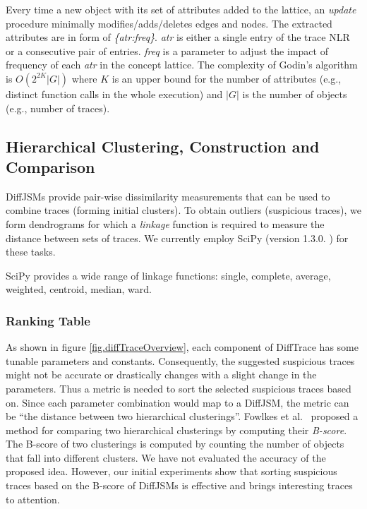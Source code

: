 Every time a new object with its set of attributes added to the lattice,
an \textit{update} procedure minimally modifies/adds/deletes edges and nodes.
%
%
The extracted attributes are in form of \textit{\{atr:freq\}}. 
%
\textit{atr} is either a single entry of the trace NLR or a consecutive pair of entries.
\textit{freq} is a parameter to adjust the impact of frequency of each \textit{atr}
in the concept lattice.
%
The complexity of Godin's algorithm is $O(2^{2K}|G|)$ where $K$ is an upper bound for the number of attributes (e.g., distinct function calls in the whole execution) and $|G|$ is the number of objects (e.g., number of traces).




\subsection{Hierarchical Clustering, Construction and Comparison}
\label{subsec:algo-bscore}

 DiffJSMs provide pair-wise dissimilarity
 measurements that can be used to combine traces (forming initial clusters).
%
To obtain outliers (suspicious traces),
we form dendrograms for which
a \textit{linkage} function is required to measure the distance between sets of traces.
% 
 We currently employ SciPy (version 1.3.0. \cite{scipy}) for these tasks.
%
%

 
%
SciPy provides a wide range of linkage functions: single, complete, average, weighted, centroid, median, ward.

\subsubsection{Ranking Table}
As shown in figure \ref{fig.diffTraceOverview}, each component of DiffTrace has some tunable parameters and constants.
%
Consequently, the suggested suspicious traces might not be accurate or drastically changes with a slight change in the parameters.
%
Thus a metric is needed to sort the selected suspicious traces based on.
%
Since each parameter combination would map to a DiffJSM, the metric can be ``the distance between two hierarchical clusterings''.
%
Fowlkes et al.~\cite{fowlkes83} proposed a method for comparing two hierarchical clusterings by computing their \textit{B-score}.
%
The B-score of two clusterings is computed by counting the number of objects that fall into different clusters.
%
We have not evaluated the accuracy of the proposed idea.
%
However, our initial experiments show that sorting suspicious traces based on the B-score of DiffJSMs is effective and brings interesting traces to attention.

